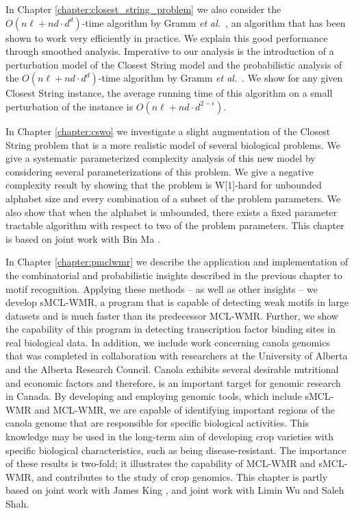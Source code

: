 In Chapter \ref{chapter:closest_string_problem} we also consider the $O(n\ell + nd \cdot d^d)$-time algorithm by Gramm {\em et al.}\ \cite{GNR03}, an algorithm that has been shown to work very efficiently in practice. We explain this good performance through smoothed analysis.  Imperative to our analysis is the introduction of a perturbation model of the {\sc Closest String} model and the probabilistic analysis of the $O(n\ell + nd \cdot d^d)$-time algorithm by Gramm {\em et al.}\ \cite{GNR03}. We show for any given {\sc Closest String} instance, the average running time of this algorithm on a small perturbation of the instance is $O(n\ell + nd \cdot d^{2 - \epsilon})$. 

In Chapter \ref{chapter:cswo} we investigate a slight augmentation of the {\sc Closest String} problem that is a more realistic model of several biological problems.  We give a systematic parameterized complexity analysis of this new model by considering several parameterizations of this problem.   We give a negative complexity result by showing that the problem is W[1]-hard for unbounded alphabet size and every combination of a subset of the problem parameters.  We also show that  when the alphabet is unbounded, there exists a fixed parameter tractable algorithm with respect to two of the problem parameters. This chapter is based on joint work with Bin Ma \cite{boucher_ma}. 

In Chapter \ref{chapter:pmclwmr} we describe the application and implementation of the combinatorial and probabilistic insights described in the previous chapter to motif recognition.  Applying these methods -- as well as other insights -- we develop sMCL-WMR, a program that is capable of detecting weak motifs in large datasets and is much faster than its predecessor MCL-WMR. Further, we show the capability of this program in detecting transcription factor binding sites in real biological data.  In addition, we include work concerning canola genomics that was completed in collaboration with researchers at the University of Alberta and the Alberta Research Council.  Canola exhibits several desirable nutritional and economic factors and therefore, is an important target for genomic research in Canada.  By developing and employing genomic tools, which include sMCL-WMR and MCL-WMR, we are capable of identifying important regions of the canola genome that are responsible for specific biological activities.  This knowledge may be used in the long-term aim of developing crop varieties with specific biological characteristics, such as being disease-resistant.  The importance of these results is two-fold; it illustrates the capability of MCL-WMR and sMCL-WMR, and contributes to the study of crop genomics.  This chapter is partly based on joint work with James King \cite{boucher_king}, and joint work with Limin Wu and Saleh Shah.

